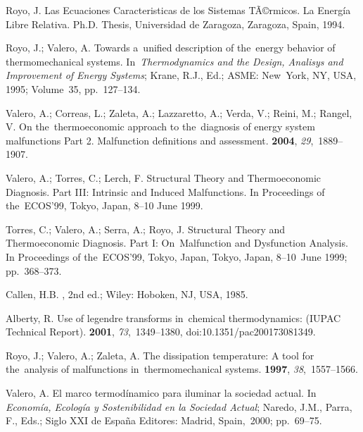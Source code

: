 \documentclass[energies,article,accept,moreauthors,pdftex]{Definitions/mdpi}
\begin{document}
\begin{thebibliography}{999}
	
	Royo, J.
	\newblock Las Ecuaciones Caracteristicas de los Sistemas TÃ©rmicos. {L}a
	Energía Libre Relativa.
	\newblock Ph.D. Thesis, Universidad de Zaragoza, Zaragoza, Spain, 1994.

	
	Royo, J.; Valero, A.
	\newblock Towards a~unified description of the~energy behavior of
	thermomechanical systems.
	\newblock  In~{\em Thermodynamics and the Design, Analisys and Improvement of Energy Systems}; Krane, R.J., Ed.; ASME: New~York, NY, USA, 1995; Volume~35, pp.~127--134.

	
	Valero, A.; Correas, L.; Zaleta, A.; Lazzaretto, A.; Verda, V.; Reini, M.;
	Rangel, V.
	\newblock On the~thermoeconomic approach to the~diagnosis of energy system
	malfunctions Part 2. Malfunction definitions and assessment.
	 {\bf 2004}, {\em 29},~1889--1907.

	
	Valero, A.; Torres, C.; Lerch, F.
	\newblock Structural Theory and Thermoeconomic Diagnosis. Part III: Intrinsic
	and Induced Malfunctions.
	\newblock In Proceedings of the~ECOS'99, Tokyo, Japan, 8--10 June 1999.

	
	Torres, C.; Valero, A.; Serra, A.; Royo, J.
	\newblock Structural Theory and Thermoeconomic Diagnosis. Part I: On~Malfunction and Dysfunction Analysis.
	\newblock In Proceedings of the~ECOS'99, Tokyo, Japan, Tokyo, Japan, 8--10~June 1999; pp.~368--373.

	
	Callen, H.B.
	,
	2nd ed.; Wiley: Hoboken, NJ, USA, 1985.

	
	Alberty, R.
	\newblock Use of legendre transforms in~chemical thermodynamics: (IUPAC
	Technical Report).
	 {\bf 2001}, {\em 73},~1349--1380, doi:10.1351/pac200173081349.

	
	Royo, J.; Valero, A.; Zaleta, A.
	\newblock The dissipation temperature: A tool for the~analysis of malfunctions
	in~thermomechanical systems.
	 {\bf 1997}, {\em
		38},~1557--1566.

	
	Valero, A.
	\newblock El marco termodínamico para iluminar la sociedad actual. In~{\em
		Economía, Ecología y Sostenibilidad en la Sociedad Actual}; Naredo, J.M.,
	Parra, F., Eds.; Siglo XXI de España Editores: Madrid, Spain,~2000; pp.~69--75.
	
	
\end{thebibliography}
\end{document}
